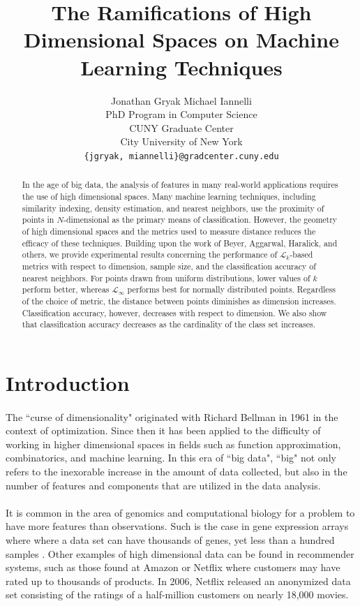 \documentclass{article}
\title{The Ramifications of High Dimensional Spaces on Machine Learning Techniques}
\author{Jonathan Gryak
\qquad
Michael Iannelli\\
PhD Program in Computer Science\\
CUNY Graduate Center\\
City University of New York\\
\texttt{\{jgryak, miannelli\}@gradcenter.cuny.edu}}
\date{}
\begin{document}
\maketitle

\begin{abstract}
In the age of big data, the analysis of features in many real-world applications requires the use of high dimensional spaces. Many machine learning techniques, including similarity indexing, density estimation, and nearest neighbors, use the proximity of points in $N$-dimensional as the primary means of classification. However, the geometry of high dimensional spaces and the metrics used to measure distance reduces the efficacy of these techniques. Building upon the work of Beyer, Aggarwal, Haralick, and others, we provide experimental results concerning the performance of $\mathcal{L}_k$-based metrics with respect to dimension, sample size, and the classification accuracy of nearest neighbors. For points drawn from uniform distributions, lower values of $k$ perform better, whereas $\mathcal{L}_{\infty}$ performs best for normally distributed points.  Regardless of the choice of metric, the distance between points diminishes as dimension increases. Classification accuracy, however, decreases with respect to dimension. We also show that classification accuracy decreases as the cardinality of the class set increases.
\end{abstract}
\tableofcontents
\section{Introduction}
\paragraph{}
The ``curse of dimensionality" originated with Richard Bellman in 1961\cite{bellman1961adaptive} in the context of optimization. Since then it has been applied to the difficulty of working in higher dimensional spaces in fields such as function approximation, combinatorics, and machine learning. In this era of ``big data", ``big" not only refers to the inexorable increase in the amount of data collected, but also in the number of features and components that are utilized in the data analysis.  
\paragraph{}
It is common in the area of genomics and computational biology for a problem to have more features than observations.  Such is the case in gene expression arrays where where a data set can have thousands of genes, yet less than a hundred samples \cite{hastie01statisticallearning}.  Other examples of high dimensional data can be found in recommender systems, such as those found at Amazon or Netflix where customers may have rated up to thousands of products.  In 2006, Netflix released an anonymized data set consisting of the ratings of a half-million customers on nearly 18,000 movies\cite{Bennett:2007:KCW:1345448.1345459}.
\end{document}
